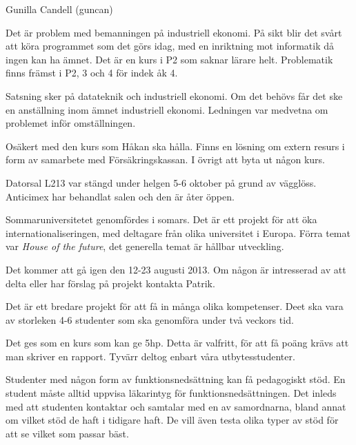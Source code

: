 \documentclass[a4paper,protocol]{miunprot}
\date{8 oktober 2012}
\begin{document}
\begin{adjuncts}
	Gunilla Candell (guncan)
\end{adjuncts}

\noindent
Det är problem med bemanningen på industriell ekonomi.
På sikt blir det svårt att köra programmet som det görs idag, med en inriktning 
mot informatik då ingen kan ha ämnet.
Det är en kurs i P2 som saknar lärare helt.
Problematik finns främst i P2, 3 och 4 för indek åk 4.

Satsning sker på datateknik och industriell ekonomi.
Om det behövs får det ske en anställning inom ämnet industriell ekonomi.
Ledningen var medvetna om problemet inför omställningen.

Osäkert med den kurs som Håkan ska hålla.
Finns en lösning om extern resurs i form av samarbete med Försäkringskassan.
I övrigt att byta ut någon kurs.


\noindent
Datorsal L213 var stängd under helgen 5-6 oktober på grund av vägglöss.
Anticimex har behandlat salen och den är åter öppen.


\noindent
Sommaruniversitetet genomfördes i somars.
Det är ett projekt för att öka internationaliseringen, med deltagare från olika 
universitet i Europa.
Förra temat var \emph{House of the future}, det generella temat är hållbar 
utveckling.

Det kommer att gå igen den 12-23 augusti 2013.
Om någon är intresserad av att delta eller har förslag på projekt kontakta 
Patrik.

Det är ett bredare projekt för att få in många olika kompetenser.
Deet ska vara av storleken 4-6 studenter som ska genomföra under två veckors 
tid.

Det ges som en kurs som kan ge \unit{5}{hp}.
Detta är valfritt, för att få poäng krävs att man skriver en rapport.
Tyvärr deltog enbart våra utbytesstudenter.


\noindent
Studenter med någon form av funktionsnedsättning kan få pedagogiskt stöd.
En student måste alltid uppvisa läkarintyg för funktionsnedsättningen.
Det inleds med att studenten kontaktar och samtalar med en av samordnarna, 
bland annat om vilket stöd de haft i tidigare haft.
De vill även testa olika typer av stöd för att se vilket som passar bäst.
\end{document}
